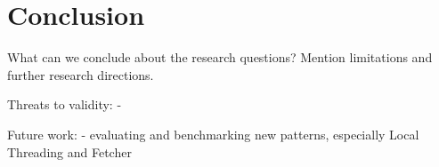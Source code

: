 \chapter{Conclusion}

What can we conclude about the research questions? Mention limitations and further research directions.


Threats to validity:
-

Future work:
- evaluating and benchmarking new patterns, especially Local Threading and Fetcher
